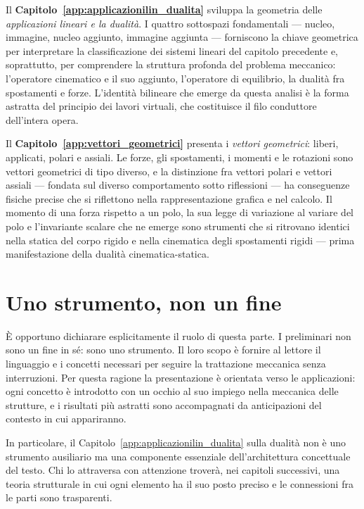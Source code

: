 Il \textbf{Capitolo~\ref{app:applicazionilin_dualita}} sviluppa 
la geometria delle \emph{applicazioni lineari e la dualità}. 
I quattro sottospazi fondamentali --- nucleo, immagine, nucleo 
aggiunto, immagine aggiunta --- forniscono la chiave geometrica 
per interpretare la classificazione dei sistemi lineari del 
capitolo precedente e, soprattutto, per comprendere la struttura 
profonda del problema meccanico: l'operatore cinematico e il 
suo aggiunto, l'operatore di equilibrio, la dualità fra 
spostamenti e forze. L'identità bilineare che emerge da questa 
analisi è la forma astratta del principio dei lavori virtuali, 
che costituisce il filo conduttore dell'intera opera.

Il \textbf{Capitolo~\ref{app:vettori_geometrici}} presenta i 
\emph{vettori geometrici}: liberi, applicati, polari e assiali. 
Le forze, gli spostamenti, i momenti e le rotazioni sono vettori 
geometrici di tipo diverso, e la distinzione fra vettori polari 
e vettori assiali --- fondata sul diverso comportamento sotto 
riflessioni --- ha conseguenze fisiche precise che si riflettono 
nella rappresentazione grafica e nel calcolo. Il momento di una 
forza rispetto a un polo, la sua legge di variazione al variare 
del polo e l'invariante scalare che ne emerge sono strumenti 
che si ritrovano identici nella statica del corpo rigido e 
nella cinematica degli spostamenti rigidi --- prima 
manifestazione della dualità cinematica-statica.

\section*{Uno strumento, non un fine}

È opportuno dichiarare esplicitamente il ruolo di questa parte. 
I preliminari non sono un fine in sé: sono uno strumento. Il 
loro scopo è fornire al lettore il linguaggio e i concetti 
necessari per seguire la trattazione meccanica senza 
interruzioni. Per questa ragione la presentazione è orientata 
verso le applicazioni: ogni concetto è introdotto con un occhio 
al suo impiego nella meccanica delle strutture, e i risultati più 
astratti sono accompagnati da anticipazioni del contesto in 
cui appariranno.

In particolare, il Capitolo~\ref{app:applicazionilin_dualita} 
sulla dualità non è uno strumento ausiliario ma una componente 
essenziale dell'architettura concettuale del testo. Chi lo 
attraversa con attenzione troverà, nei capitoli successivi, 
una teoria strutturale in cui ogni elemento ha il suo posto 
preciso e le connessioni fra le parti sono trasparenti.